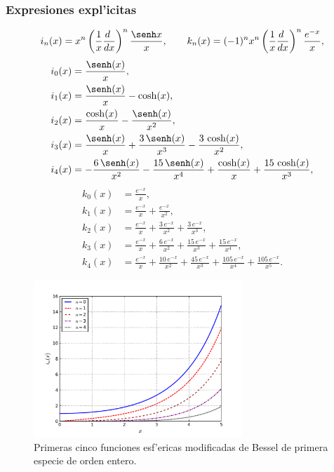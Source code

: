 \subsubsection{Expresiones expl'icitas}
\begin{equation}
i_n(x)=x^n\left(\frac{1}{x}\frac{d\ }{dx}\right)^n\frac{\senh x}{x}, \qquad 
k_n(x)=(-1)^nx^n\left(\frac{1}{x}\frac{d\ }{dx}\right)^n\frac{e^{-x}}{x},
\end{equation}
\begin{align}
i_0(x) &= \frac{\senh (x)}{x}, \\
i_1(x) &= \frac{\senh (x)}{x}-\cosh (x), \\
i_2(x) &=\frac{\cosh (x)}{x}-\frac{\senh (x) }{{x}^{2}}, \\
i_3(x) &= \frac{\senh (x)}{x}+\frac{3\,\senh (x) }{{x}^{3}}-\frac{3\,\cosh (x) }{{x}^{2}}, \\
i_4(x) &= -\frac{6\,\senh (x) }{{x}^{2}}-\frac{15\,\senh (x) }{{x}^{4}}+\frac{\cosh (x) }{x}+\frac{15\,\cosh (x) }{{x}^{3}},
\end{align}
\begin{align}
k_0(x) &= \frac{{e}^{-x}}{x} , \\
k_1(x) &= \frac{{e}^{-x}}{x}+\frac{{e}^{-x}}{{x}^{2}}, \\
k_2(x) &= \frac{{e}^{-x}}{x}+\frac{3\,{e}^{-x}}{{x}^{2}}+\frac{3\,{e}^{-x}}{{x}^{3}}, \\
k_3(x) &= \frac{{e}^{-x}}{x}+\frac{6\,{e}^{-x}}{{x}^{2}}+\frac{15\,{e}^{-x}}{{x}^{3}}+\frac{15\,{e}^{-x}}{{x}^{4}}, \\
k_4(x) &= \frac{{e}^{-x}}{x}+\frac{10\,{e}^{-x}}{{x}^{2}}+\frac{45\,{e}^{-x}}{{x}^{3}}+\frac{105\,{e}^{-x}}{{x}^{4}}+\frac{105\,{e}^{-x}}{{x}^{5}}.
\end{align}
\begin{figure}[H]
\centering
\includegraphics[angle=0,width=0.7\textwidth]{figs/fig-Bessel-Esferica-i.pdf}
\caption{Primeras cinco funciones esf'ericas modificadas de Bessel de primera especie de orden entero.}
\label{fig-in}
\end{figure}
